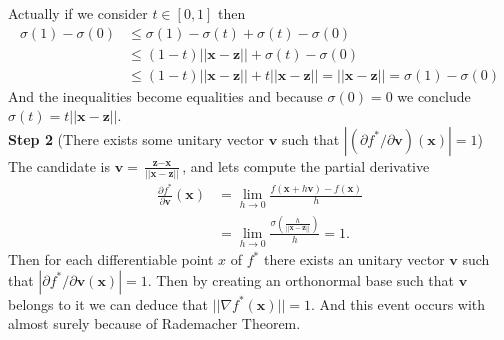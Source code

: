 Actually if we consider $t\in [0,1]$ then 
\begin{align*}
\sigma(1)-\sigma(0)&\leq \sigma(1)-\sigma(t)+\sigma(t)-\sigma(0)\\
&\leq (1-t) || \textbf{x}-\textbf{z}||+\sigma(t)-\sigma(0)
\\&\leq (1-t) || \textbf{x}-\textbf{z}||+t|| \textbf{x}-\textbf{z}||=|| \textbf{x}-\textbf{z}||=\sigma(1)-\sigma(0)
\end{align*}
And the inequalities become equalities and because $\sigma(0)=0$ we conclude $\sigma(t)=t|| \textbf{x}-\textbf{z}||$.
\\
\textbf{Step 2} (There exists some unitary vector $\textbf{v}$ such that $|(\partial f^* /\partial \textbf{v})(\textbf{x})|= 1$)\\
The candidate is $\textbf{v}=\frac{\textbf{z}-\textbf{x}}{||\textbf{x}-\textbf{z} ||}$, and lets compute the partial derivative
\begin{align*}
\frac{\partial f^* }{\partial \textbf{v}}(\textbf{x})&=\lim_{h\rightarrow 0}\frac{f(\textbf{x}+h\textbf{v})-f(\textbf{x})}{h}\\
&=\lim_{h\rightarrow 0}\frac{\sigma(\frac{h}{||\textbf{x}-\textbf{z} ||})}{h}=1.
\end{align*}
Then for each differentiable point $x$ of $f^*$ there exists an unitary vector $\textbf{v}$ such that $|\partial f^* /\partial \textbf{v}(\textbf{x})|= 1$. Then by creating an orthonormal base such that $\textbf{v}$ belongs to it we can deduce that $||\nabla f^*(\textbf{x})||=1$. And this event occurs with almost surely because of Rademacher Theorem.

